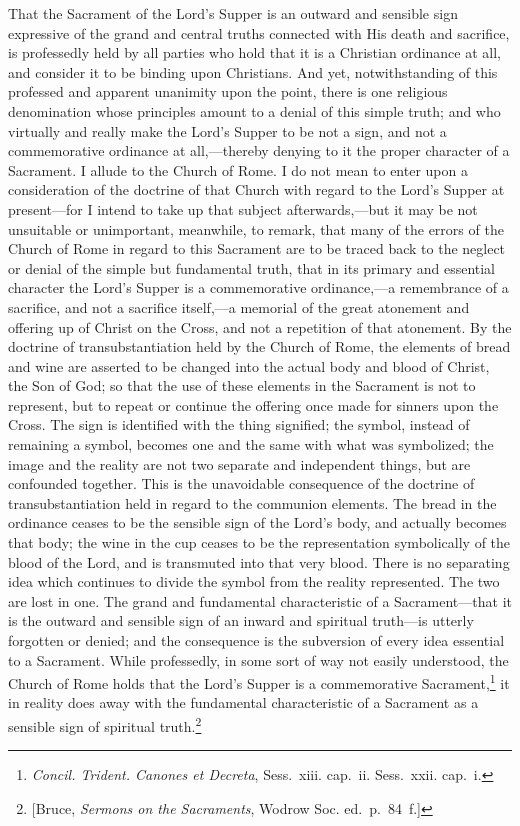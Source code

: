 \documentclass[
  english,
]{book}
\providecommand{\textlatin}{}
\renewcommand{\textlatin}[2][]{\foreignlanguage{latin}{#2}}
\begin{document}
That the Sacrament of the Lord's Supper is an outward and sensible sign expressive of the grand and central truths connected with His death and sacrifice, is professedly held by all parties who hold that it is a Christian ordinance at all, and consider it to be binding upon Christians. And yet, notwithstanding of this professed and apparent unanimity upon the point, there is one religious denomination whose principles amount to a denial of this simple truth; and who virtually and really make the Lord's Supper to be not a sign, and not a commemorative ordinance at all,---thereby denying to it the proper character of a Sacrament. I allude to the Church of Rome. I do not mean to enter upon a consideration of the doctrine of that Church with regard to the Lord's Supper at present---for I intend to take up that subject afterwards,---but it may be not unsuitable or unimportant, meanwhile, to remark, that many of the errors of the Church of Rome in regard to this Sacrament are to be traced back to the neglect or denial of the simple but fundamental truth, that in its primary and essential character the Lord's Supper is a commemorative ordinance,---a remembrance of a sacrifice, and not a sacrifice itself,---a memorial of the great atonement and offering up of Christ on the Cross, and not a repetition of that atonement. By the doctrine of transubstantiation held by the Church of Rome, the elements of bread and wine are asserted to be changed into the actual body and blood of Christ, the Son of God; so that the use of these elements in the Sacrament is not to represent, but to repeat or continue the offering once made for sinners upon the Cross. The sign is identified with the thing signified; the symbol, instead of remaining a symbol, becomes one and the same with what was symbolized; the image and the reality are not two separate and independent things, but are confounded together. This is the unavoidable consequence of the doctrine of transubstantiation held in regard to the communion elements. The bread in the ordinance ceases to be the sensible sign of the Lord's body, and actually becomes that body; the wine in the cup ceases to be the representation symbolically of the blood of the Lord, and is transmuted into that very blood. There is no separating idea which continues to divide the symbol from the reality represented. The two are lost in one. The grand and fundamental characteristic of a Sacrament---that it is the outward and sensible sign of an inward and spiritual truth---is utterly forgotten or denied; and the consequence is the subversion of every idea essential to a Sacrament. While professedly, in some sort of way not easily understood, the Church of Rome holds that the Lord's Supper is a commemorative Sacrament,\footnote{\textlatin{\emph{Concil. Trident. Canones et Decreta}}, Sess.~xiii. cap.~ii. Sess.~xxii. cap.~i.} it in reality does away with the fundamental characteristic of a Sacrament as a sensible sign of spiritual truth.\footnote{{[}Bruce, \emph{Sermons on the Sacraments}, Wodrow Soc. ed.~p.~84~f.{]}}
\end{document}
